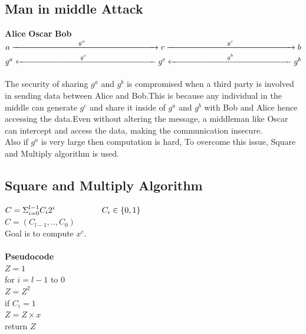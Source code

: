 \documentclass[11pt]{article}
\begin{document}
\subsection*{Man in middle Attack}
\textbf{Alice} \hspace{5cm} \textbf{Oscar} \hspace{5cm} \textbf{Bob} \\
$ a \xrightarrow{\hspace*{2.75cm}g^a\hspace{3cm}} c \xrightarrow{\hspace*{2.5cm}g^c\hspace{2.5cm}} b $ \\
$ g^a \xleftarrow{\hspace*{2.75cm}g^c\hspace{3cm}} g^c \xleftarrow{\hspace*{2.5cm}g^b\hspace{2.5cm}} g^b $ \\
\\
The security of sharing $g^a$ and $g^b$ is compromised when a third party is involved in sending data between Alice and Bob.This is because any individual in the middle can generate $g^c$ and share it inside of $g^a$ and $g^b$ with Bob and Alice hence accessing the data.Even without altering the message, a middleman like Oscar can intercept and access the data, making the communication insecure. \\
Also if $g^a$ is very large then computation is hard, To overcome this issue, Square and Multiply algorithm is used.

\subsection*{Square and Multiply Algorithm}
$C = \Sigma_{i=0}^{l-1} C_i 2^i  \hspace*{2cm} C_i \in \{0,1\}$ \\
$C = (C_{l-1},..,C_0)$ \\
Goal is to compute $x^c$. \\
\\
\textbf{Pseudocode}\\
$Z = 1$ \\
for $i=l-1$ to $0$ \\
\hspace*{0.5cm}$Z = Z^2$ \\
\hspace*{0.5cm}if $C_i = 1$ \\
\hspace*{0.8cm} $Z = Z \times x$ \\
return $Z$ \\
\\
\end{document}
